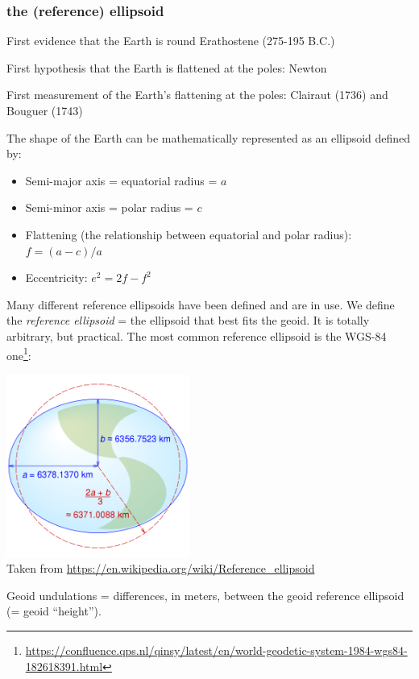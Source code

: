 \subsubsection{the (reference) ellipsoid}

First evidence that the Earth is round Erathostene (275-195 B.C.)

First hypothesis that the Earth is flattened at the poles: Newton

First measurement of the Earth’s flattening at the poles: Clairaut (1736) and Bouguer (1743)

The shape of the Earth can be mathematically represented as an ellipsoid defined by:
\begin{itemize}
\item Semi-major axis = equatorial radius = $a$
\item Semi-minor axis = polar radius = $c$
\item Flattening (the relationship between equatorial and polar radius): $f = (a-c)/a$
\item Eccentricity: $e^2 =2f-f^2$
\end{itemize}

Many different reference ellipsoids have been defined and are in use.
We define the {\it reference ellipsoid} = the ellipsoid that best fits the geoid.
It is totally arbitrary, but practical. 
The most common reference ellipsoid is the WGS-84 one\footnote{\url{https://confluence.qps.nl/qinsy/latest/en/world-geodetic-system-1984-wgs84-182618391.html}}:

\begin{center}
\includegraphics[width=6cm]{images/geoid/ellipsoid_wgs84}\\
Taken from \url{https://en.wikipedia.org/wiki/Reference_ellipsoid}
\end{center}


Geoid undulations = differences, in meters, between
the geoid reference ellipsoid
(= geoid “height”).

